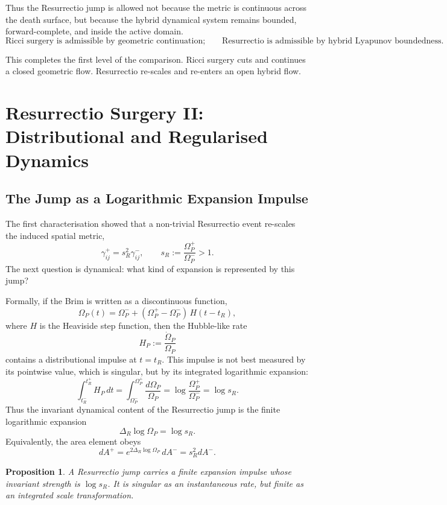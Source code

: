 \documentclass[11pt,a4paper,oneside]{book}
\theoremstyle{plain}
\newtheorem{proposition}{Proposition}[chapter]
\theoremstyle{definition}
\theoremstyle{remark}
\begin{document}
Thus the Resurrectio jump is allowed not because the metric is continuous
across the death surface, but because the hybrid dynamical system remains
bounded, forward-complete, and inside the active domain.
\[
\boxed{
\text{Ricci surgery is admissible by geometric continuation;}
\qquad
\text{Resurrectio is admissible by hybrid Lyapunov boundedness.}
}
\]

This completes the first level of the comparison. Ricci surgery cuts and
continues a closed geometric flow. Resurrectio re-scales and re-enters an
open hybrid flow.

\section{Resurrectio Surgery II: Distributional and Regularised Dynamics}

\subsection{The Jump as a Logarithmic Expansion Impulse}

The first characterisation showed that a non-trivial Resurrectio event
re-scales the induced spatial metric,
\[
\gamma^+_{ij}=s_R^2\gamma^-_{ij},
\qquad
s_R:=\frac{\Omega_P^+}{\Omega_P^-}>1.
\]
The next question is dynamical: what kind of expansion is represented by this
jump?

Formally, if the Brim is written as a discontinuous function,
\[
\Omega_P(t)
=
\Omega_P^-
+
(\Omega_P^+-\Omega_P^-)\,H(t-t_R),
\]
where \(H\) is the Heaviside step function, then the Hubble-like rate
\[
H_P:=\frac{\dot{\Omega}_P}{\Omega_P}
\]
contains a distributional impulse at \(t=t_R\). This impulse is not best
measured by its pointwise value, which is singular, but by its integrated
logarithmic expansion:
\[
\int_{t_R^-}^{t_R^+}H_P\,dt
=
\int_{\Omega_P^-}^{\Omega_P^+}\frac{d\Omega_P}{\Omega_P}
=
\log\frac{\Omega_P^+}{\Omega_P^-}
=
\log s_R.
\]
Thus the invariant dynamical content of the Resurrectio jump is the finite
logarithmic expansion
\[
\boxed{
\Delta_R\log\Omega_P=\log s_R.
}
\]
Equivalently, the area element obeys
\[
dA^+=e^{2\Delta_R\log\Omega_P}\,dA^-
=s_R^2dA^-.
\]

\begin{proposition}
A Resurrectio jump carries a finite expansion impulse whose invariant strength
is \(\log s_R\). It is singular as an instantaneous rate, but finite as an
integrated scale transformation.
\end{proposition}
\end{document}
